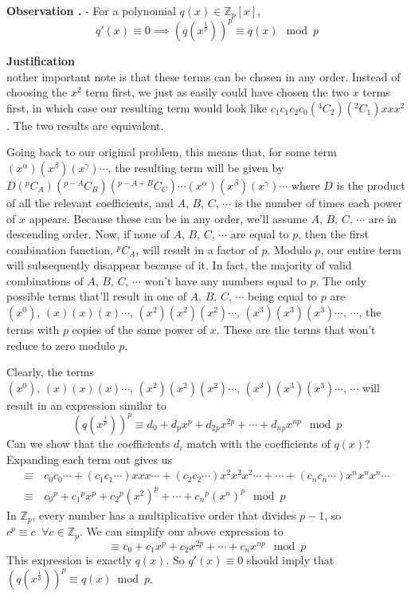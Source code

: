 \documentclass[a4paper, reqno, 12pt]{amsart}
\newcommand\combine[2]{{}^{#1}C_{#2}}
\newcounter{obscounter}[section]
\newenvironment{observation}[2]
{
	\refstepcounter{obscounter} %
	\addcontentsline{toc}{subsection}{\thesection .\theobscounter \;\;\;\; #2}
	\textbf{Observation \thesection .\theobscounter} 
	- #1
	
	\textbf{Justification} \\
}
{
	\vspace{1cm}
}
\begin{document}
\begin{observation}{For a polynomial $q(x) \in \mathds{Z}_{p}[x]$, 
		\[
			q'(x) \equiv 0 \implies (q(x^{\frac{1}{p}}))^p \equiv q(x) \mod{p}
		\]}
			Another important note is that these terms can be chosen in any order. Instead of choosing the $x^2$ term first, we just as easily could have chosen the two
			$x$ terms first, in which case our resulting term would look like ${c_1}{c_1}{c_2}{c_0}(\combine{4}{2})(\combine{2}{1})xxx^2$. The two results are equivalent.
			
			Going back to our original problem, this means that, for some term $(x^\alpha)(x^\beta)(x^\gamma)\cdots$, the resulting term will be given by 
			$D(\combine{p}{A})(\combine{p - A}{B})(\combine{p - A+B}{C})\cdots(x^\alpha)(x^\beta)(x^\gamma)\cdots$ where $D$ is the product of all the relevant 
			coefficients, and $A, \, B, \, C, \, \cdots$ is the number of times each power of $x$ appears. Because these can be in any order, we'll assume 
			$A, \, B, \, C, \, \cdots$ are in descending order. Now, if none of $A, \, B, \, C, \, \cdots$ are equal to $p$, then the first combination function, 
			$\combine{p}{A}$, will result in a factor of $p$. Modulo $p$, our entire term will subsequently disappear because of it. In fact, the majority of valid 
			combinations of $A, \, B, \, C, \, \cdots$ won't have any numbers equal to $p$. The only possible terms that'll result in one of $A, \, B, \, C, \, \cdots$ being
			equal to $p$ are $(x^0), \, (x)(x)(x)\cdots, \, (x^2)(x^2)(x^2)\cdots, \, (x^3)(x^3)(x^3)\cdots, \, \cdots$, the terms with $p$ copies of the same power of $x$. 
			These are the terms that won't reduce to zero modulo $p$.
			
			Clearly, the terms $(x^0), \, (x)(x)(x)\cdots, \, (x^2)(x^2)(x^2)\cdots, \, (x^3)(x^3)(x^3)\cdots, \, \cdots$ will result in an expression similar to
			\[
				(q(x^{\frac{1}{p}}))^p \equiv d_0 + {d_p}x^p + {d_{2p}}x^{2p} + \cdots + {d_{np}}x^{np} \mod{p}
			\]
			Can we show that the coefficients $d_i$ match with the coefficients of $q(x)$? Expanding each term out gives us
			\begin{align*}
				\equiv & \, {c_0}{c_0}\cdots + ({c_1}{c_1}\cdots){x}xx\cdots + ({c_2}{c_2}\cdots){x^2}{x^2}{x^2}\cdots + \cdots + ({c_n}{c_n}\cdots)
				{x^n}{x^n}{x^n}\cdots \\
				\equiv & \, {{c_0}^p} + {{c_1}^p}x^p + {{c_2}^p}(x^2)^p + \cdots + {{c_n}^p}(x^n)^p \mod{p}
			\end{align*}
			In $\mathds{Z}_{p}$, every number has a multiplicative order that divides $p-1$, so $c^p \equiv c \;\; \forall c \in \mathds{Z}_{p}$. We can simplify our above
			expression to
			\[
				\equiv c_0 + {c_1}x^p + {c_2}x^{2p} + \cdots + {c_n}x^{np} \mod{p}
			\]
			This expression is exactly $q(x)$. So $q'(x) \equiv 0$ should imply that $(q(x^{\frac{1}{p}}))^p \equiv q(x) \bmod{p}$.
		\end{observation}
	
\end{document}
